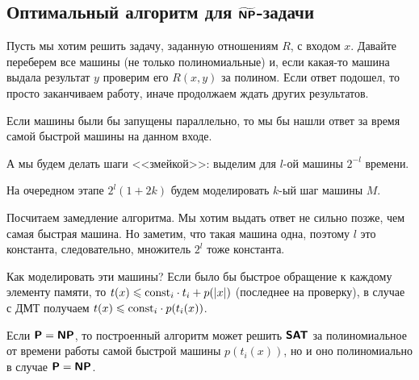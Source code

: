 \subsection{Оптимальный алгоритм для $\widetilde{\textmd{\textbf{\textsf{NP}}}}$-задачи}
Пусть мы хотим решить задачу, заданную отношениям $ R$, с входом $ x$.
Давайте переберем все машины (не только полиномиальные) и, если какая-то машина выдала результат $ y $ проверим его $ R(x, y)$ за полином. Если ответ подошел, то просто заканчиваем работу, иначе продолжаем ждать других результатов.

Если машины были бы запущены параллельно, то мы бы нашли ответ за время самой быстрой машины на данном входе.

А мы будем делать шаги <<змейкой>>: выделим для $ l$-ой машины $ 2^{-l}$ времени. 

На очередном этапе $ 2^{l}(1 + 2k)$ будем моделировать $ k$-ый шаг машины $ M$. 

Посчитаем замедление алгоритма. Мы хотим выдать ответ не сильно позже, чем самая быстрая машина. Но заметим, что такая машина одна, поэтому $ l$ это константа, следовательно, множитель $ 2^{l}$ тоже константа.

Как моделировать эти машины? Если было бы быстрое обращение к каждому элементу памяти, то $ t(x) \leqslant \textmd{const}_i \cdot t_i + p(\lvert x \rvert )$ (последнее на проверку), в случае с ДМТ получаем  $ t(x) \leqslant \textmd{const}_{i}\cdot p(t_i(x))$.

\begin{note}
	Если $ \textmd{\textbf{\textsf{P}}} = \textmd{\textbf{\textsf{NP}}}$, то построенный алгоритм может решить $\textmd{\textbf{\textsf{SAT}}}$ за полиномиальное от времени работы самой быстрой машины  $ p(t_i(x))$, но и оно полиномиально в случае $ \textmd{\textbf{\textsf{P}}} = \textmd{\textbf{\textsf{NP}}}$.
\end{note}

